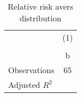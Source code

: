 \begin{table}[htbp]\centering
\def\sym#1{\ifmmode^{#1}\else\(^{#1}\)\fi}
\caption{Relative risk avers distribution}
\begin{tabular}{l*{1}{c}}
\hline\hline
                    &\multicolumn{1}{c}{(1)}\\
                    &\multicolumn{1}{c}{}\\
                    &           b\\
\hline
\hline
Observations        &          65\\
Adjusted \(R^{2}\)  &            \\
\hline\hline
\end{tabular}
\end{table}
